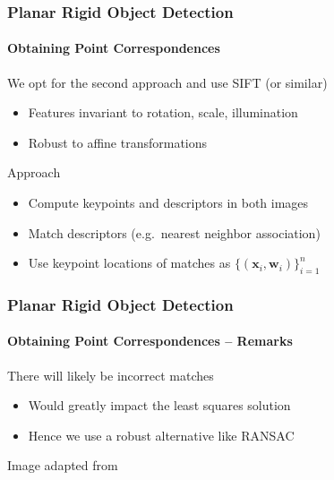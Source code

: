 \documentclass[xetex,professionalfont]{beamer}
\renewcommand{\vec}[1]{\ensuremath{\mathbf{#1}}}
\newcommand{\vw}{\vec{w}}
\newcommand{\vx}{\vec{x}}
\begin{document}
\begin{frame}
\frametitle{Planar Rigid Object Detection}
\framesubtitle{Obtaining Point Correspondences}

We opt for the second approach and use SIFT (or similar)
\begin{itemize}
    \item Features invariant to rotation, scale, illumination %
    \item Robust to affine transformations %
\end{itemize}

\bigskip
Approach
\begin{itemize}
    \item Compute keypoints and descriptors in both images
    \item Match descriptors (e.g.\ nearest neighbor association)
    \item Use keypoint locations of matches as $\{(\vx_i,\vw_i)\}_{i=1}^n$
\end{itemize}

\end{frame}


\begin{frame}\label{homography-ransac}
\frametitle{Planar Rigid Object Detection}
\framesubtitle{Obtaining Point Correspondences -- Remarks}

There will likely be incorrect matches
\begin{itemize}
    \item Would greatly impact the least squares solution
    \item Hence we use a robust alternative like RANSAC
\end{itemize}

\bigskip
\begin{center}
    {\centering Image adapted from \cite{prince12}}
\end{center}

\end{frame}
\end{document}
